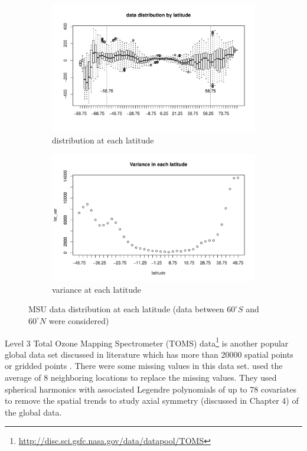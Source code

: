 \begin{figure}[H]
	\begin{subfigure}{.5\textwidth}
		\centering
		\includegraphics[width=1\linewidth]{graphs//MSU_data_latitude}
		\caption{distribution at each latitude}
		\label{MSU_data_latitude}
	\end{subfigure}
	\begin{subfigure}{.5\textwidth}
		\centering
		\includegraphics[width=1\linewidth]{graphs/MSU_data_var_lat}
		\caption{variance at each latitude}
		\label{MSU_data_var_lat}
	\end{subfigure}
	\caption[MSU Data Distribution at each Latitude (Data Between $60^\circ S$ and $60^\circ N$]{MSU data distribution at each latitude (data between $60^\circ S$ and $60^\circ N$ were considered)}
	\label{compare_varigram_sim_2}
\end{figure}

Level 3 Total Ozone Mapping Spectrometer (TOMS) data\footnote{\url{http://disc.sci.gsfc.nasa.gov/data/datapool/TOMS}} is another popular global data set discussed in literature which has more than 20000 spatial points or gridded points \citep{Stein2007, CressieJohannesson2008, JunStein2008}. There were some missing values in this data set. \cite{Stein2007} used the average of 8 neighboring locations to replace the missing values. They used spherical harmonics with associated Legendre polynomials of up to 78 covariates to remove the spatial trends to study axial symmetry (discussed in Chapter 4) of the global data.

